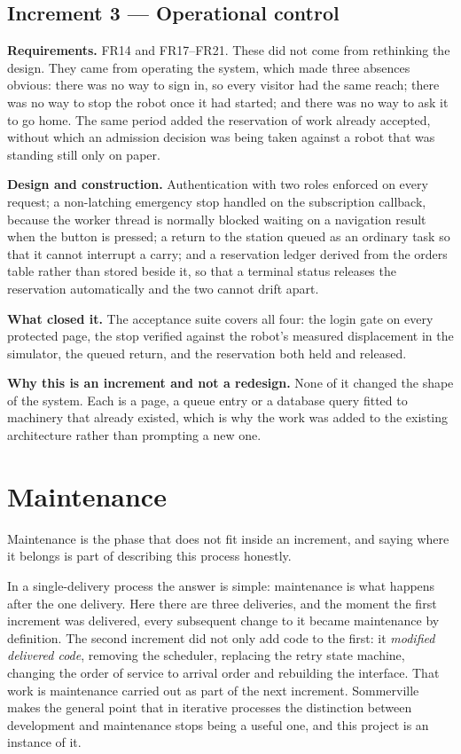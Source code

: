 \documentclass[12pt,a4paper]{report}
\begin{document}
\subsection{Increment 3 --- Operational control}
\textbf{Requirements.} FR14 and FR17--FR21. These did not come from rethinking the design. They came
from operating the system, which made three absences obvious: there was no way to sign in, so every
visitor had the same reach; there was no way to stop the robot once it had started; and there was no
way to ask it to go home. The same period added the reservation of work already accepted, without
which an admission decision was being taken against a robot that was standing still only on paper.

\textbf{Design and construction.} Authentication with two roles enforced on every request; a
non-latching emergency stop handled on the subscription callback, because the worker thread is
normally blocked waiting on a navigation result when the button is pressed; a return to the station
queued as an ordinary task so that it cannot interrupt a carry; and a reservation ledger derived
from the orders table rather than stored beside it, so that a terminal status releases the
reservation automatically and the two cannot drift apart.

\textbf{What closed it.} The acceptance suite covers all four: the login gate on every protected
page, the stop verified against the robot's measured displacement in the simulator, the queued
return, and the reservation both held and released.

\textbf{Why this is an increment and not a redesign.} None of it changed the shape of the system.
Each is a page, a queue entry or a database query fitted to machinery that already existed, which
is why the work was added to the existing architecture rather than prompting a new one.


\section{Maintenance}
\label{sec:maintenance}
Maintenance is the phase that does not fit inside an increment, and saying where it belongs is part
of describing this process honestly.

In a single-delivery process the answer is simple: maintenance is what happens after the one
delivery. Here there are three deliveries, and the moment the first increment was delivered, every
subsequent change to it became maintenance by definition. The second increment did not only add
code to the first: it \emph{modified delivered code}, removing the scheduler, replacing the retry
state machine, changing the order of service to arrival order and rebuilding the interface. That
work is maintenance carried out as part of the next increment. Sommerville makes the general point
that in iterative processes the distinction between development and maintenance stops being a
useful one, and this project is an instance of it.
\end{document}
